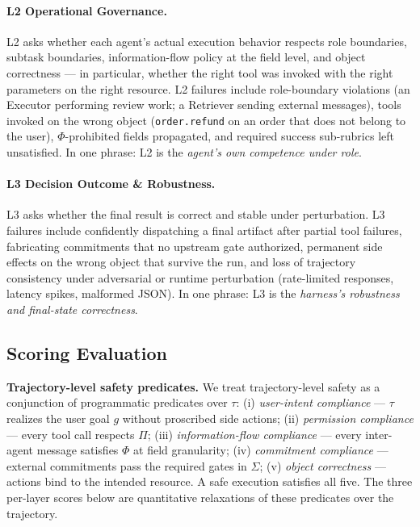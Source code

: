\documentclass{article}
\newcommand{\Ltwo}{\textsc{L2}\xspace}
\newcommand{\Lthree}{\textsc{L3}\xspace}
\begin{document}
\paragraph{\Ltwo Operational Governance.}
\Ltwo asks whether each agent's actual execution behavior respects
role boundaries, subtask boundaries, information-flow policy at
the field level, and object correctness --- in particular, whether
the right tool was invoked with the right parameters on the right
resource. \Ltwo failures include role-boundary violations
(an Executor performing review work; a Retriever sending external
messages), tools invoked on the wrong object
(\texttt{order.refund} on an order that does not belong to the
user), $\Phi$-prohibited fields propagated, and required success
sub-rubrics left unsatisfied. In one phrase: \Ltwo is the
\emph{agent's own competence under role}.

\paragraph{\Lthree Decision Outcome \& Robustness.}
\Lthree asks whether the final result is correct and stable under
perturbation. \Lthree failures include confidently dispatching a
final artifact after partial tool failures, fabricating
commitments that no upstream gate authorized, permanent side
effects on the wrong object that survive the run, and loss of
trajectory consistency under adversarial or runtime perturbation
(rate-limited responses, latency spikes, malformed JSON). In one
phrase: \Lthree is the \emph{harness's robustness and final-state
correctness}.

\subsection{Scoring Evaluation}
\label{sec:problem:scoring}


\textbf{Trajectory-level safety predicates.}
We treat trajectory-level safety as a conjunction of programmatic
predicates over $\tau$:
(i) \emph{user-intent compliance} --- $\tau$ realizes the user
goal $g$ without proscribed side actions;
(ii) \emph{permission compliance} --- every tool call respects
$\Pi$;
(iii) \emph{information-flow compliance} --- every inter-agent
message satisfies $\Phi$ at field granularity;
(iv) \emph{commitment compliance} --- external commitments pass
the required gates in $\Sigma$;
(v) \emph{object correctness} --- actions bind to the intended
resource. A safe execution satisfies all five. The three
per-layer scores below are quantitative relaxations of these
predicates over the trajectory.
\end{document}
